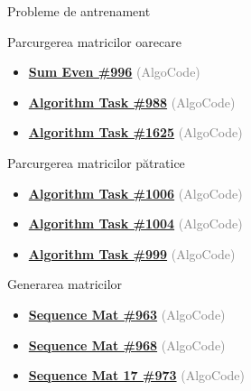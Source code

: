 \documentclass{beamer}
\begin{document}
\begin{frame}{Probleme de antrenament}
  \begin{block}{Parcurgerea matricilor oarecare}
    \begin{itemize}\footnotesize\itemsep0pt
      \item \href{https://code.algolymp.com/problems/996}{\textbf{Sum Even \#996}} {\footnotesize\textcolor{gray}{(AlgoCode)}}
      \item \href{https://code.algolymp.com/problems/988}{\textbf{Algorithm Task \#988}} {\footnotesize\textcolor{gray}{(AlgoCode)}}
      \item \href{https://code.algolymp.com/problems/1625}{\textbf{Algorithm Task \#1625}} {\footnotesize\textcolor{gray}{(AlgoCode)}}
    \end{itemize}
  \end{block}
  \vspace{-4pt}
  \begin{block}{Parcurgerea matricilor pătratice}
    \begin{itemize}\footnotesize\itemsep0pt
      \item \href{https://code.algolymp.com/problems/1006}{\textbf{Algorithm Task \#1006}} {\footnotesize\textcolor{gray}{(AlgoCode)}}
      \item \href{https://code.algolymp.com/problems/1004}{\textbf{Algorithm Task \#1004}} {\footnotesize\textcolor{gray}{(AlgoCode)}}
      \item \href{https://code.algolymp.com/problems/999}{\textbf{Algorithm Task \#999}} {\footnotesize\textcolor{gray}{(AlgoCode)}}
    \end{itemize}
  \end{block}
  \vspace{-4pt}
  \begin{block}{Generarea matricilor}
    \begin{itemize}\footnotesize\itemsep0pt
      \item \href{https://code.algolymp.com/problems/963}{\textbf{Sequence Mat \#963}} {\footnotesize\textcolor{gray}{(AlgoCode)}}
      \item \href{https://code.algolymp.com/problems/968}{\textbf{Sequence Mat \#968}} {\footnotesize\textcolor{gray}{(AlgoCode)}}
      \item \href{https://code.algolymp.com/problems/973}{\textbf{Sequence Mat 17 \#973}} {\footnotesize\textcolor{gray}{(AlgoCode)}}
    \end{itemize}
  \end{block}
\end{frame}
\end{document}
